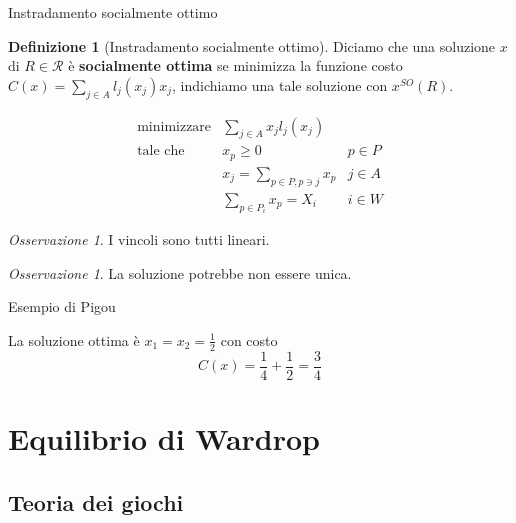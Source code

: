 \documentclass{beamer}
\newcounter{counter1}
\theoremstyle{plain}
\theoremstyle{definition}
\newtheorem{mydef}[counter1]{Definizione}
\theoremstyle{remark}
\newtheorem{myoss}[counter1]{Osservazione}
\begin{document}
\begin{frame}{Instradamento socialmente ottimo}
  \begin{mydef}[Instradamento socialmente ottimo]
    Diciamo che una soluzione $x$ di $R \in \mathcal{R}$ è
    \textbf{socialmente ottima} se minimizza la funzione costo
    $C(x) = \sum_{j\in A} l_j(x_j)x_j$, indichiamo una tale soluzione
    con $x^{SO}(R)$.
  \end{mydef}
  \[
    \begin{matrix}
      \text{minimizzare} & \sum _{j\in A} x_j l_j(x_j) \\
      \text{tale che} &   x_p \ge 0 & p\in P \\
      & x_j = \sum_{p\in P,p\ni j} x_p & j\in A \\
      &\sum_{p\in P_i} x_p = X_i & i\in W
    \end{matrix}
  \]
  \begin{myoss}
    I vincoli sono tutti lineari.
  \end{myoss}
  \begin{myoss}
    La soluzione potrebbe non essere unica.
  \end{myoss}
\end{frame}

\begin{frame}{Esempio di Pigou}
  \begin{center}
  \end{center}
  La soluzione ottima è $x_1 = x_2 = \frac{1}{2}$ con costo
  \[ C(x) = \frac{1}{4} + \frac{1}{2} = \frac{3}{4} \]
\end{frame}

\section{Equilibrio di Wardrop}

\subsection{Teoria dei giochi}
\end{document}
